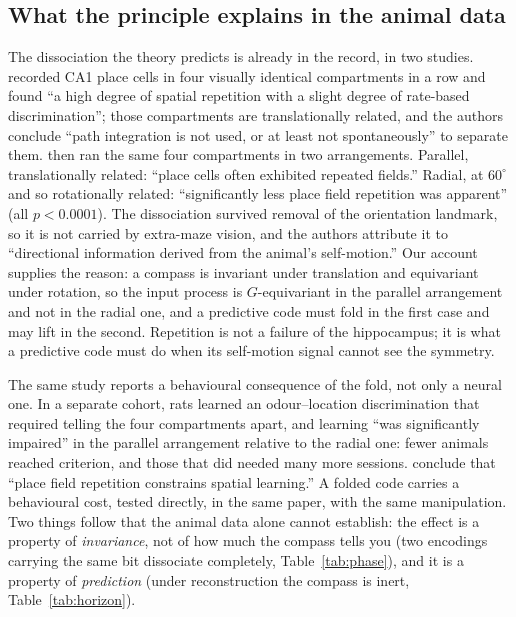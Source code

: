 \subsection*{What the principle explains in the animal data}

The dissociation the theory predicts is already in the record, in two studies. \citet{spiers2015}
recorded CA1 place cells in four visually identical compartments in a row and found ``a high degree of
spatial repetition with a slight degree of rate-based discrimination''; those compartments are
translationally related, and the authors conclude ``path integration is not used, or at least not
spontaneously'' to separate them. \citet{grieves2016} then ran the same four compartments in two
arrangements. Parallel, translationally related: ``place cells often exhibited repeated fields.''
Radial, at $60^\circ$ and so rotationally related: ``significantly less place field repetition was
apparent'' (all $p < 0.0001$). The dissociation survived removal of the orientation landmark, so it is
not carried by extra-maze vision, and the authors attribute it to ``directional information derived
from the animal's self-motion.'' Our account supplies the reason: a compass is invariant under
translation and equivariant under rotation, so the input process is $G$-equivariant in the parallel
arrangement and not in the radial one, and a predictive code must fold in the first case and may lift
in the second. Repetition is not a failure of the hippocampus; it is what a predictive code must do
when its self-motion signal cannot see the symmetry.

The same study reports a behavioural consequence of the fold, not only a neural one. In a separate
cohort, rats learned an odour--location discrimination that required telling the four compartments
apart, and learning ``was significantly impaired'' in the parallel arrangement relative to the radial
one: fewer animals reached criterion, and those that did needed many more sessions. \citet{grieves2016}
conclude that ``place field repetition constrains spatial learning.'' A folded code carries a
behavioural cost, tested directly, in the same paper, with the same manipulation. Two things follow
that the animal data alone cannot establish: the effect is a property of \emph{invariance}, not of how
much the compass tells you (two encodings carrying the same bit dissociate completely,
Table~\ref{tab:phase}), and it is a property of \emph{prediction} (under reconstruction the compass is
inert, Table~\ref{tab:horizon}).

